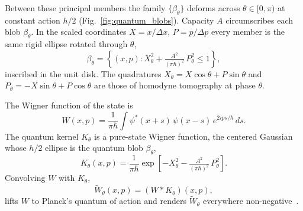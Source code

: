 \documentclass[aps,prl,reprint,amsmath,amssymb,floatfix,nofootinbib]{revtex4-2}
\begin{document}
Between these principal members the family $\{\beta_\theta\}$ deforms across $\theta \in [0,\pi)$ at constant action $h/2$ (Fig.~\ref{fig:quantum_blobs}). Capacity $A$ circumscribes each blob $\beta_\theta$. In the scaled coordinates $X = x/\Delta x$, $P = p/\Delta p$ every member is the same rigid ellipse rotated through $\theta$,
\begin{equation}
\beta_\theta = \left\{ (x,p) : X_\theta^{2} + \tfrac{A^2}{(\pi\hbar)^2}\, P_\theta^{2} \le 1 \right\},
\label{eq:atheta}
\end{equation}
inscribed in the unit disk. The quadratures $X_\theta = X\cos\theta + P\sin\theta$ and $P_\theta = -X\sin\theta + P\cos\theta$ are those of homodyne tomography at phase $\theta$.

The Wigner function of the state is
\begin{equation}
W(x,p) = \frac{1}{\pi\hbar}\int \psi^*(x+s)\,\psi(x-s)\,e^{2ips/\hbar}\,ds.
\label{eq:wigner}
\end{equation}
The quantum kernel $K_\theta$ is a pure-state Wigner function, the centered Gaussian whose $h/2$ ellipse is the quantum blob $\beta_\theta$,
\begin{equation}
K_\theta(x, p) = \frac{1}{\pi\hbar}\exp\!\left[ -X_\theta^{2} - \tfrac{A^2}{(\pi\hbar)^2}\, P_\theta^{2} \right].
\label{eq:Ktheta}
\end{equation}
Convolving $W$ with $K_\theta$,
\begin{equation}
\widetilde W_\theta(x,p) = (W * K_\theta)(x,p),
\label{eq:Wtheta}
\end{equation}
lifts $W$ to Planck's quantum of action and renders $\widetilde W_\theta$ everywhere non-negative~\cite{cartwright1976,degosson2005bullsci,cordero2018}.
\end{document}
